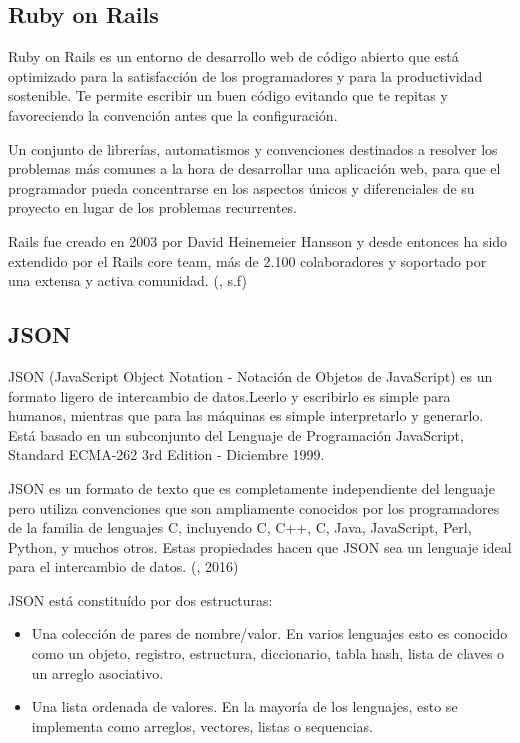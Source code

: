 
\subsection{Ruby on Rails}
\setlength{\parskip}{5mm}
Ruby on Rails es un entorno de desarrollo web de código abierto que está optimizado para la satisfacción de los programadores y para la productividad sostenible. Te permite escribir un buen código evitando que te repitas y favoreciendo la convención antes que la configuración.

Un conjunto de librerías, automatismos y convenciones destinados a resolver los problemas más comunes a la hora de desarrollar una aplicación web, para que el programador pueda concentrarse en los aspectos únicos y diferenciales de su proyecto en lugar de los problemas recurrentes.

Rails fue creado en 2003 por David Heinemeier Hansson y desde entonces ha sido extendido por el Rails core team, más de 2.100 colaboradores y soportado por una extensa y activa comunidad. (\citet{rubybib}, s.f)

\setlength{\parskip}{0mm}



\subsection{JSON}
\setlength{\parskip}{5mm}
JSON (JavaScript Object Notation - Notación de Objetos de JavaScript) es un formato ligero de intercambio de datos.Leerlo y escribirlo es simple para humanos, mientras que para las máquinas es simple interpretarlo y generarlo. Está basado en un subconjunto del Lenguaje de Programación JavaScript, Standard ECMA-262 3rd Edition - Diciembre 1999. 

JSON es un formato de texto que es completamente independiente del lenguaje pero utiliza convenciones que son ampliamente conocidos por los programadores de la familia de lenguajes C, incluyendo C, C++, C, Java, JavaScript, Perl, Python, y muchos otros. Estas propiedades hacen que JSON sea un lenguaje ideal para el intercambio de datos. (\citet{jsonbib}, 2016)

JSON está constituído por dos estructuras:
 \setlength{\parskip}{0mm}
\begin{itemize}

	\item Una colección de pares de nombre/valor. En varios lenguajes esto es conocido como un objeto, registro, estructura, diccionario, tabla hash, lista de claves o un arreglo asociativo.
	
	\item Una lista ordenada de valores. En la mayoría de los lenguajes, esto se implementa como arreglos, vectores, listas o sequencias.

	
\end{itemize}

